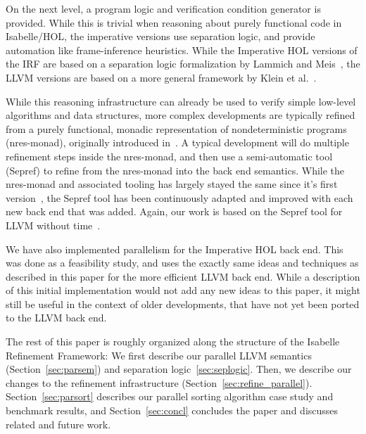 \documentclass[runningheads]{llncs}
\begin{document}
On the next level, a program logic and verification condition generator is provided.
While this is trivial when reasoning about purely functional code in Isabelle/HOL,
the imperative versions use separation logic, and provide automation like frame-inference heuristics.
While the Imperative HOL versions of the IRF are based on a separation logic formalization
by Lammich and Meis~\cite{LaMe12}, the LLVM versions are based on a more general framework by Klein et al.~\cite{KKB12,KKB12_afp}.

While this reasoning infrastructure can already be used to verify simple low-level algorithms and data structures,
more complex developments are typically refined from a purely functional,
monadic representation of nondeterministic programs (nres-monad), originally introduced in~\cite{LaTu12}.
A typical development will do multiple refinement steps inside the nres-monad, and then use a
semi-automatic tool (Sepref) to refine from the nres-monad into the back end semantics.
While the nres-monad and associated tooling has largely stayed the same since it's first version~\cite{LaTu12},
the Sepref tool has been continuously adapted and improved with each new back end that was added.
Again, our work is based on the Sepref tool for LLVM without time~\cite{La19-llvm}.

We have also implemented parallelism for the Imperative HOL back end.
This was done as a feasibility study, and uses the exactly same ideas and
techniques as described in this paper for the more efficient LLVM back end.
While a description of this initial implementation would not add any new
ideas to this paper, it might still be useful in the context of older developments,
that have not yet been ported to the LLVM back end.

The rest of this paper is roughly organized along the structure of the Isabelle Refinement Framework:
We first describe our parallel LLVM semantics (Section~\ref{sec:parsem}) and separation logic~\ref{sec:seplogic}.
Then, we describe our changes to the refinement infrastructure (Section~\ref{sec:refine_parallel}).
Section~\ref{sec:parsort} describes our parallel sorting algorithm case study and benchmark results,
and Section~\ref{sec:concl} concludes the paper and discusses related and future work.


%
%
%
%
%
%
%
\end{document}
